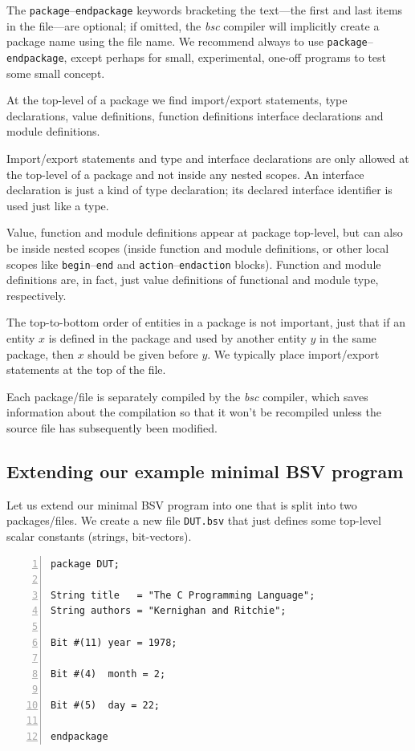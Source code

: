 The \verb|package|--\verb|endpackage| keywords bracketing the
text---the first and last items in the file---are optional; if
omitted, the \emph{bsc} compiler will implicitly create a package name
using the file name.  We recommend always to use
\verb|package|--\verb|endpackage|, except perhaps for small,
experimental, one-off programs to test some small concept.

At the top-level of a package we find import/export statements, type
declarations, value definitions, function definitions interface
declarations and module definitions.

Import/export statements and type and interface declarations are only
allowed at the top-level of a package and not inside any nested
scopes.  An interface declaration is just a kind of type declaration;
its declared interface identifier is used just like a type.

Value, function and module definitions appear at package top-level,
but can also be inside nested scopes (inside function and module
definitions, or other local scopes like \verb|begin|--\verb|end| and
\verb|action|--\verb|endaction| blocks).  Function and module
definitions are, in fact, just value definitions of functional and
module type, respectively.

The top-to-bottom order of entities in a package is not important,
just that if an entity $x$ is defined in the package and used by
another entity $y$ in the same package, then $x$ should be given
before $y$.  We typically place import/export statements at the top of
the file.

Each package/file is separately compiled by the \emph{bsc} compiler,
which saves information about the compilation so that it won't be
recompiled unless the source file has subsequently been modified.

\hdivider


\subsection{Extending our example minimal BSV program}

Let us extend our minimal BSV program into one that is split into two
packages/files.  We create a new file \verb|DUT.bsv| that just defines
some top-level scalar constants (strings, bit-vectors).

{\small
\begin{Verbatim}[frame=single, numbers=left, label=in file Ex\_04\_02/DUT.bsv]
package DUT;

String title   = "The C Programming Language";
String authors = "Kernighan and Ritchie";

Bit #(11) year = 1978;

Bit #(4)  month = 2;

Bit #(5)  day = 22;

endpackage
\end{Verbatim}
}

